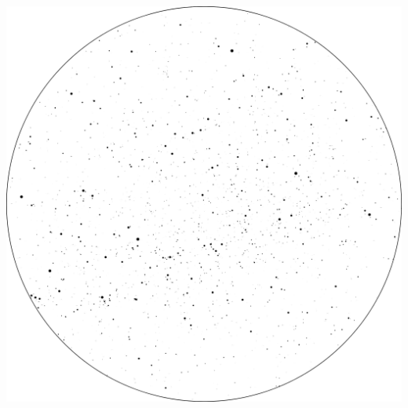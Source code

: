 \documentclass{SAS-class-skygen}
\begin{document}
	\vspace{0.5cm}
    \begin{center}
    \includegraphics[width=\textwidth]{./pics/sky_chart15.png}
    \end{center}
    
    
\end{document}
